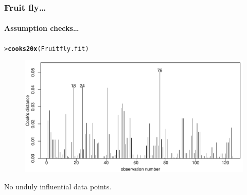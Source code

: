 \documentclass{beamer}\usepackage[]{graphicx}\usepackage[]{xcolor}
\makeatletter
\newcommand{\hlstd}[1]{\textcolor[rgb]{0.345,0.345,0.345}{#1}}%
\newcommand{\hlkwd}[1]{\textcolor[rgb]{0.737,0.353,0.396}{\textbf{#1}}}%
\newenvironment{kframe}{%
 \def\at@end@of@kframe{}%
 \ifinner\ifhmode%
  \def\at@end@of@kframe{\end{minipage}}%
  \begin{minipage}{\columnwidth}%
 \fi\fi%
 \def\FrameCommand##1{\hskip\@totalleftmargin \hskip-\fboxsep
 \colorbox{shadecolor}{##1}\hskip-\fboxsep
     \hskip-\linewidth \hskip-\@totalleftmargin \hskip\columnwidth}%
 \MakeFramed {\advance\hsize-\width
   \@totalleftmargin\z@ \linewidth\hsize
   \@setminipage}}%
 {\par\unskip\endMakeFramed%
 \at@end@of@kframe}
\newenvironment{knitrout}{}{} %
\makeatother
\begin{document}
\begin{frame}[fragile]

\frametitle{Fruit fly\ldots}
\framesubtitle{Assumption checks\ldots}

\begin{knitrout}\scriptsize
{}\color{fgcolor}\begin{kframe}
\begin{alltt}
\hlstd{> }\hlkwd{cooks20x}\hlstd{(Fruitfly.fit)}
\end{alltt}
\end{kframe}
\end{knitrout}



\begin{figure}
  \centering
  \includegraphics[scale = 0.5]{figure/RC-H11-008}
\end{figure}

No unduly influential data points.

\end{frame}
\end{document}
